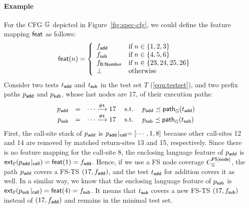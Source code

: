 \paragraph{\textbf{Example}}
%
For the CFG $\mathbb{G}$ depicted in Figure~\ref{fig:spec-cfg}, we could define the
feature mapping $\textsf{feat}$ as follows:
\begin{equation}\label{equ:featmap}
  \textsf{feat}(n) = \left\{
    \begin{array}{ll}
      f_{\textsf{add}} & \text{if} \; n \in \{ 1, 2, 3\} \\
      f_{\textsf{sub}} & \text{if} \; n \in \{ 4, 5, 6\} \\
      f_{\textsf{B:Number}} & \text{if} \; n \in \{ 23, 24, 25, 26 \} \\
      \bot & \text{otherwise}
    \end{array}
  \right.
\end{equation}
%
Consider two tests $t_{\textsf{add}}$ and $t_{\textsf{sub}}$ in the test set $T$
(\ref{equ:testset}), and two prefix paths $p_{\textsf{add}}$ and $p_{\textsf{sub}}$, whose last
nodes are 17, of their execution paths:
%
\begin{equation}\label{equ:prepath}
  \begin{array}{rclcl}
    p_{\textsf{add}} &=& \cdots \xrightarrow{\textsf{\#t}} 17 &{\; \text{s.t.} \; }&
    p_{\textsf{add}} \preceq \textsf{path}_{\mathbb{G}}(t_{\textsf{add}})\\

    p_{\textsf{sub}} &=& \cdots \xrightarrow{\textsf{\#t}} 17 &{\; \text{s.t.} \; }&
    p_{\textsf{sub}} \preceq \textsf{path}_{\mathbb{G}}(t_{\textsf{sub}})\\
  \end{array}
\end{equation}
%
First, the call-site stack of $p_{\textsf{add}}$ is ${p_{\textsf{add}}}\!\mid_{\textsf{call}} = [\cdots, 1, 8]$
because other call-sites 12 and 14 are removed by matched return-sites 13 and
15, respectively.
%
Since there is no feature mapping for the call-site 8, the enclosing language
feature of $p_{\textsf{add}}$ is $\textsf{ext}_{\mathbb{F}}({p_{\textsf{add}}}\!\mid_{\textsf{call}}) = \textsf{feat}(1) = f_{\textsf{add}}$.
%
Hence, if we use a FS node coverage $C_{\mathbb{G}}^{\textsf{FS}[\textsf{node}]}$, the path $p_{\textsf{add}}$
covers a FS-TS $(17, f_{\textsf{add}})$, and the test $t_{\textsf{add}}$ for addition covers it
as well.
%
In a similar way, we know that the enclosing language feature of $p_{\textsf{sub}}$
is $\textsf{ext}_{\mathbb{F}}({p_{\textsf{sub}}}\!\mid_{\textsf{call}}) = \textsf{feat}(4) = f_{\textsf{sub}}$.
%
It means that $t_{\textsf{sub}}$ covers a new FS-TS $(17, f_{\textsf{sub}})$ instead of $(17,
f_{\textsf{add}})$ and remains in the minimal test set.


